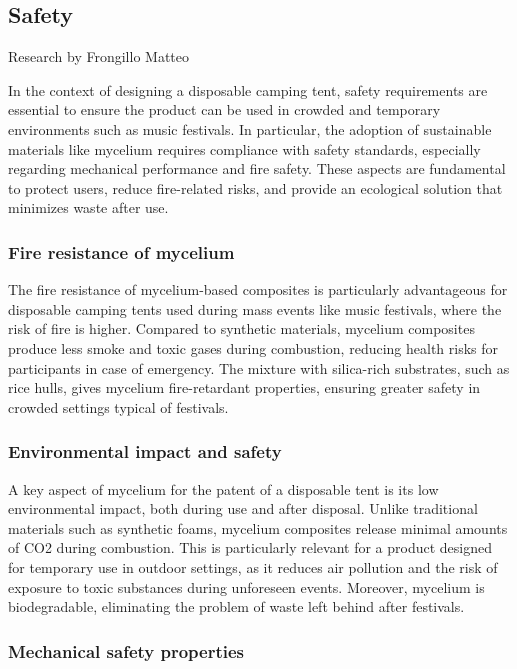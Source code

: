 \subsection{Safety}
{\small Research by Frongillo Matteo}

In the context of designing a disposable camping tent, safety requirements are essential to ensure
the product can be used in crowded and temporary environments such as music festivals.
In particular, the adoption of sustainable materials like mycelium requires compliance with safety
standards, especially regarding mechanical performance and fire safety. These aspects are fundamental
to protect users, reduce fire-related risks, and provide an ecological solution that minimizes waste
after use.

\subsubsection{Fire resistance of mycelium}

The fire resistance of mycelium-based composites is particularly advantageous for disposable camping
tents used during mass events like music festivals, where the risk of fire is higher. Compared to
synthetic materials, mycelium composites produce less smoke and toxic gases during combustion, reducing
health risks for participants in case of emergency. The mixture with silica-rich substrates, such as
rice hulls, gives mycelium fire-retardant properties, ensuring greater safety in crowded settings typical
of festivals.


\subsubsection{Environmental impact and safety}

A key aspect of mycelium for the patent of a disposable tent is its low environmental impact, both during
use and after disposal. Unlike traditional materials such as synthetic foams, mycelium composites release
minimal amounts of CO2 during combustion. This is particularly relevant for a product designed for
temporary use in outdoor settings, as it reduces air pollution and the risk of exposure to toxic substances
during unforeseen events. Moreover, mycelium is biodegradable, eliminating the problem of waste left behind
after festivals.


\subsubsection{Mechanical safety properties}

